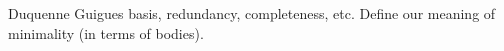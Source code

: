

Duquenne Guigues basis, redundancy, completeness, etc. Define our meaning of
minimality (in terms of bodies). 